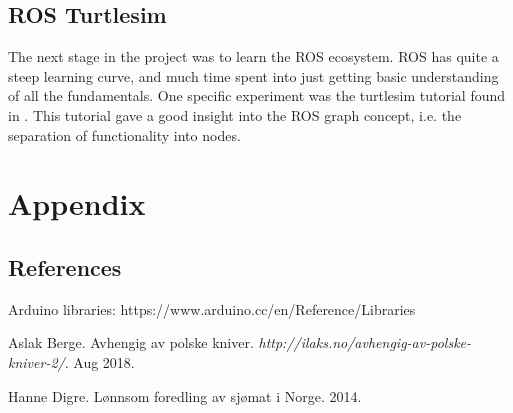 \documentclass[11pt,a4paper, titlepage]{article}
\begin{document}
	\subsection{ROS Turtlesim}
	The next stage in the project was to learn the ROS ecosystem. ROS has quite a steep learning curve, and much time spent into just getting basic understanding of all the fundamentals. One specific experiment was the turtlesim tutorial found in . This tutorial gave a good insight into the ROS graph concept, i.e. the separation of functionality into nodes.
	
	
	
	
	\section{Appendix}
	
	\subsection{References}
	Arduino libraries: https://www.arduino.cc/en/Reference/Libraries
	

\begin{thebibliography}{1}

 Aslak Berge. Avhengig av polske kniver. \textit{http://ilaks.no/avhengig-av-polske-kniver-2/}. Aug 2018.

 Hanne Digre. Lønnsom foredling av sjømat i Norge. 2014.

\end{thebibliography}	
	
\end{document}
